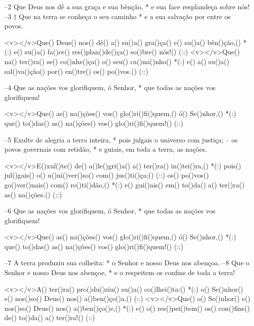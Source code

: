 –2 Que Deus nos dê a sua graça e sua bênção, *
e sua face resplandeça sobre nós!
–3 † Que na terra se conheça o seu caminho *
e a sua salvação por entre os povos.

<v></v>Que() Deus() nos() dê() a() su()a() gra()ça() e() su()a() bên()ção,() *(:)
e() su()a() fa()ce() res()plan()de()ça() so()bre() nós!() (::)
<v></v>Que() na() ter()ra() se() co()nhe()ça() o() seu() ca()mi()nho() *(:)
e() a() su()a() sal()va()ção() por() en()tre() os() po()vos.() (::)

–4 Que as nações vos glorifiquem, ó Senhor, *
que todas as nações vos glorifiquem!

<v></v>Que() as() na()ções() vos() glo()ri()fi()quem,() ó() Se()nhor,() *(:)
que() to()das() as() na()ções() vos() glo()ri()fi()quem!() (::)

–5 Exulte de alegria a terra inteira, *
pois julgais o universo com justiça;
– os povos governais com retidão, *
e guiais, em toda a terra, as nações.

<v></v>E()xul()te() de() a()le()gri()a() a() ter()ra() in()tei()ra,() *(:)
pois() jul()gais() o() u()ni()ver()so() com() jus()ti()ça;() (::)
os() po()vos() go()ver()nais() com() re()ti()dão,() *(:)
e() gui()ais() em() to()da() a() ter()ra() as() na()ções.() (::)

–6 Que as nações vos glorifiquem, ó Senhor, *
que todas as nações vos glorifiquem!

<v></v>Que() as() na()ções() vos() glo()ri()fi()quem,() ó() Se()nhor,() *(:)
que() to()das() as() na()ções() vos() glo()ri()fi()quem!() (::)

–7 A terra produziu sua colheita: *
o Senhor e nosso Deus nos abençoa.
–8 Que o Senhor e nosso Deus nos abençoe, *
e o respeitem os confins de toda a terra!

<v></v>A() ter()ra() pro()du()ziu() su()a() co()lhei()ta:() *(:)
o() Se()nhor() e() nos()so() Deus() nos() a()ben()ço()a.() (::)
<v></v>Que() o() Se()nhor() e() nos()so() Deus() nos() a()ben()ço()e,() *(:)
e() o() res()pei()tem() os() con()fins() de() to()da() a() ter()ra!() (::)